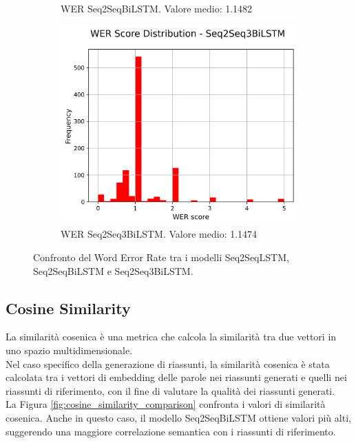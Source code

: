 \documentclass[a4paper, 12pt]{article}
\begin{document}
\begin{figure}[H]
\begin{subfigure}{0.45\textwidth}
        \caption{WER Seq2SeqBiLSTM. Valore medio: 1.1482}
    \end{subfigure}
    \begin{subfigure}{0.45\textwidth}
        \centering
        \includegraphics[width=\textwidth]{media/Seq2Seq3BiLSTM_wer_scores.png}
        \caption{WER Seq2Seq3BiLSTM. Valore medio: 1.1474}
    \end{subfigure}
    \caption{Confronto del Word Error Rate tra i modelli Seq2SeqLSTM, Seq2SeqBiLSTM e Seq2Seq3BiLSTM.}
    \label{fig:wer_comparison}
\end{figure}

\subsection{Cosine Similarity}
La similarità cosenica è una metrica che calcola la similarità tra due vettori in uno spazio multidimensionale.\\
Nel caso specifico della generazione di riassunti, la similarità cosenica è stata calcolata tra i vettori di embedding delle parole nei riassunti generati e quelli nei riassunti di riferimento, con il fine di valutare la qualità dei riassunti generati.\\
La Figura \ref{fig:cosine_similarity_comparison} confronta i valori di similarità cosenica. Anche in questo caso, il modello Seq2SeqBiLSTM ottiene valori più alti, suggerendo una maggiore correlazione semantica con i riassunti di riferimento.
\end{document}
